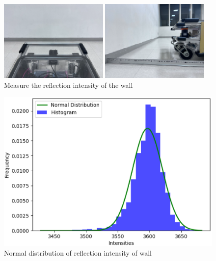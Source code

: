   \begin{figure}[h]
    \centering
    \begin{minipage}[c]{65mm} 
        \centering
        \includegraphics[height=40mm]{images/eps/RobotGuidance_exp1_wall_from_back}
    \end{minipage}
    \begin{minipage}[c]{65mm} 
        \centering
        \includegraphics[height=40mm]{images/eps/RobotGuidance_exp1_wall_from_side}
    \end{minipage}
    \caption{Measure the reflection intensity of the wall}
    \label{Fig:RobotGuidance_exp1_wall}
  \end{figure}

  \begin{figure}[h]
    \centering
    \includegraphics[keepaspectratio, scale=0.50] {images/eps/RobotGuidance_plot_reflection_intensities_of_wall}
    \captionsetup{justification=raggedright} %
    \caption{Normal distribution of reflection intensity of wall}
    \label{Fig:Normal distribution of reflection intensity of wall}
  \end{figure}

